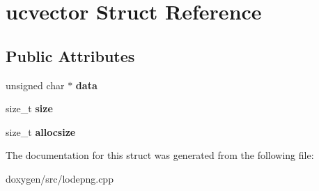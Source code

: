 \hypertarget{structucvector}{}\section{ucvector Struct Reference}
\label{structucvector}
\subsection*{Public Attributes}
\begin{DoxyCompactItemize}
\item 
\mbox{\label{structucvector_ace794c5713208c5a20f21762cd87c919}} 
unsigned char $\ast$ {\bfseries data}
\item 
\mbox{\label{structucvector_a27c99c34de0c5b3ca0c242d402c69499}} 
size\+\_\+t {\bfseries size}
\item 
\mbox{\label{structucvector_a235168baac13f0c78bd3e309dc170f90}} 
size\+\_\+t {\bfseries allocsize}
\end{DoxyCompactItemize}


The documentation for this struct was generated from the following file\+:\begin{DoxyCompactItemize}
\item 
doxygen/src/lodepng.\+cpp\end{DoxyCompactItemize}
